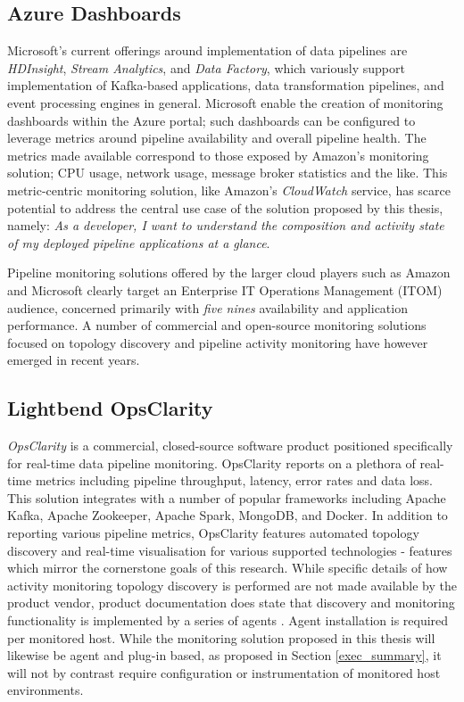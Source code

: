 \subsection{Azure Dashboards}
Microsoft's current offerings around implementation of data pipelines are \textit{HDInsight},  \textit{Stream Analytics}, and  \textit{Data Factory}, which variously support implementation of Kafka-based applications, data transformation pipelines, and event processing engines in general. Microsoft enable the creation of monitoring dashboards within the Azure portal; such dashboards can be configured to leverage metrics around pipeline availability and overall pipeline health. The metrics made available correspond to those exposed by Amazon's monitoring solution; CPU usage, network usage, message broker statistics and the like. This metric-centric monitoring solution, like Amazon's \textit{CloudWatch} service, has scarce potential to address the central use case of the solution proposed by this thesis, namely: \textit{As a developer, I want to understand the composition and activity state of my deployed pipeline applications at a glance}. 

Pipeline monitoring solutions offered by the larger cloud players such as Amazon and Microsoft clearly target an Enterprise IT Operations Management (ITOM) audience, concerned primarily with \textit{five nines} availability and application performance. A number of commercial and open-source monitoring solutions focused on topology discovery and pipeline activity monitoring have however emerged in recent years.

\subsection{Lightbend OpsClarity}
\textit{OpsClarity} is a commercial, closed-source software product positioned specifically for real-time data pipeline monitoring\cite{OpsClarity}. OpsClarity reports on a plethora of real-time metrics including pipeline throughput, latency, error rates and data loss.  This solution integrates with a number of popular frameworks including Apache Kafka, Apache Zookeeper, Apache Spark, MongoDB, and Docker. In addition to reporting various pipeline metrics, OpsClarity features automated topology discovery and real-time visualisation for various supported technologies - features which mirror the cornerstone goals of this research. While specific details of how activity monitoring topology discovery is performed are not made available by the product vendor, product documentation does state that discovery and monitoring functionality is implemented by a series of agents \cite{OpsClarity_agents}. Agent installation is required per monitored host. While the monitoring solution proposed in this thesis will likewise be agent and plug-in based, as proposed in Section \ref{exec_summary}, it will not by contrast require configuration or instrumentation of monitored host environments.

